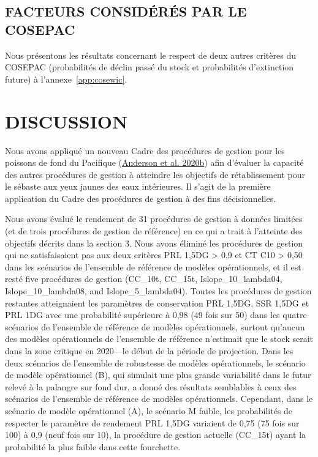 \documentclass[french,11pt]{book}
\begin{document}
\hypertarget{facteurs-considuxe9ruxe9s-par-le-cosepac}{%
\subsection{FACTEURS CONSIDÉRÉS PAR LE COSEPAC}\label{facteurs-considuxe9ruxe9s-par-le-cosepac}}

Nous présentons les résultats concernant le respect de deux autres critères du COSEPAC (probabilités de déclin passé du stock et probabilités d'extinction future) à l'annexe~\ref{app:cosewic}.

\hypertarget{sec:discussion}{%
\section{DISCUSSION}\label{sec:discussion}}

Nous avons appliqué un nouveau Cadre des procédures de gestion pour les poissons de fond du Pacifique (\protect\hyperlink{ref-anderson2020gfmp}{Anderson et al. 2020b}) afin d'évaluer la capacité des autres procédures de gestion à atteindre les objectifs de rétablissement pour le sébaste aux yeux jaunes des eaux intérieures. Il s'agit de la première application du Cadre des procédures de gestion à des fins décisionnelles.

Nous avons évalué le rendement de 31 procédures de gestion à données limitées (et de trois procédures de gestion de référence) en ce qui a trait à l'atteinte des objectifs décrits dans la section 3. Nous avons éliminé les procédures de gestion qui ne satisfaisaient pas aux deux critères PRL 1,5DG \textgreater{} 0,9 et CT C10 \textgreater{} 0,50 dans les scénarios de l'ensemble de référence de modèles opérationnels, et il est resté five procédures de gestion (CC\_10t, CC\_15t, Islope\_10\_lambda04, Islope\_10\_lambda08, and Islope\_5\_lambda04). Toutes les procédures de gestion restantes atteignaient les paramètres de conservation PRL 1,5DG, SSR 1,5DG et PRL 1DG avec une probabilité supérieure à 0,98 (49 fois sur 50) dans les quatre scénarios de l'ensemble de référence de modèles opérationnels, surtout qu'aucun des modèles opérationnels de l'ensemble de référence n'estimait que le stock serait dans la zone critique en 2020---le début de la période de projection. Dans les deux scénarios de l'ensemble de robustesse de modèles opérationnels, le scénario de modèle opérationnel (B), qui simulait une plus grande variabilité dans le futur relevé à la palangre sur fond dur, a donné des résultats semblables à ceux des scénarios de l'ensemble de référence de modèles opérationnels. Cependant, dans le scénario de modèle opérationnel (A), le scénario M faible, les probabilités de respecter le paramètre de rendement PRL 1,5DG variaient de 0,75 (75 fois sur 100) à 0,9 (neuf fois sur 10), la procédure de gestion actuelle (CC\_15t) ayant la probabilité la plus faible dans cette fourchette.
\end{document}
